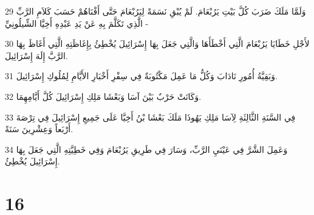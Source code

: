 \par 29 وَلَمَّا مَلَكَ ضَرَبَ كُلَّ بَيْتِ يَرُبْعَامَ. لَمْ يُبْقِ نَسَمَةً لِيَرُبْعَامَ حَتَّى أَفْنَاهُمْ حَسَبَ كَلاَمِ الرَّبِّ الَّذِي تَكَلَّمَ بِهِ عَنْ يَدِ عَبْدِهِ أَخِيَّا الشِّيلُونِيِّ -
\par 30 لأَجْلِ خَطَايَا يَرُبْعَامَ الَّتِي أَخْطَأَهَا وَالَّتِي جَعَلَ بِهَا إِسْرَائِيلَ يُخْطِئُ بِإِغَاظَتِهِ الَّتِي أَغَاظَ بِهَا الرَّبَّ إِلَهَ إِسْرَائِيلَ.
\par 31 وَبَقِيَّةُ أُمُورِ نَادَابَ وَكُلُّ مَا عَمِلَ مَكْتُوبَةٌ فِي سِفْرِ أَخْبَارِ الأَيَّامِ لِمُلُوكِ إِسْرَائِيلَ.
\par 32 وَكَانَتْ حَرْبٌ بَيْنَ آسَا وَبَعْشَا مَلِكِ إِسْرَائِيلَ كُلَّ أَيَّامِهِمَا.
\par 33 فِي السَّنَةِ الثَّالِثَةِ لِآسَا مَلِكِ يَهُوذَا مَلَكَ بَعْشَا بْنُ أَخِيَّا عَلَى جَمِيعِ إِسْرَائِيلَ فِي تِرْصَةَ أَرْبَعاً وَعِشْرِينَ سَنَةً.
\par 34 وَعَمِلَ الشَّرَّ فِي عَيْنَيِ الرَّبِّ، وَسَارَ فِي طَرِيقِ يَرُبْعَامَ وَفِي خَطِيَّتِهِ الَّتِي جَعَلَ بِهَا إِسْرَائِيلَ يُخْطِئُ.

\chapter{16}

